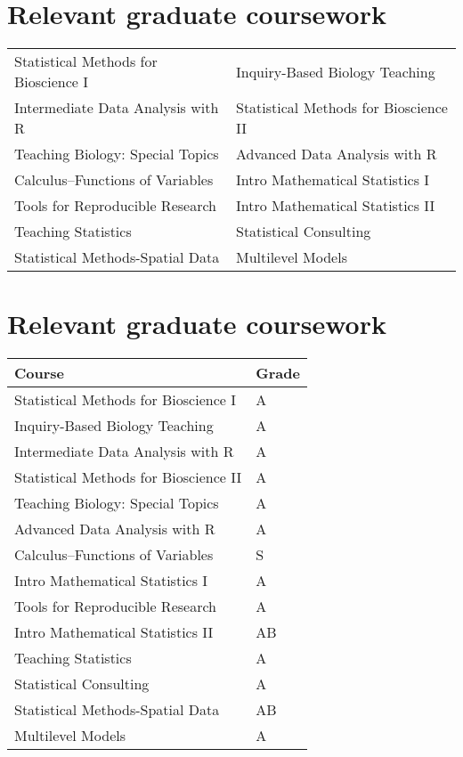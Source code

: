 \documentclass{article}
\begin{document}
\section*{Relevant graduate coursework}
\label{sec:org5770c94}

\begin{center}
\begin{tabular}{ll}
Statistical Methods for Bioscience I & Inquiry-Based Biology Teaching\\
Intermediate Data Analysis with R & Statistical Methods for Bioscience II\\
Teaching Biology: Special Topics & Advanced Data Analysis with R\\
Calculus--Functions of Variables & Intro Mathematical Statistics I\\
Tools for Reproducible Research & Intro Mathematical Statistics II\\
Teaching Statistics & Statistical Consulting\\
Statistical Methods-Spatial Data & Multilevel Models\\
\end{tabular}
\end{center}

\section*{Relevant graduate coursework}
\label{sec:orgb87ab4d}
\begin{center}
\begin{tabular}{ll}
Course & Grade\\
\hline
Statistical Methods for Bioscience I & A\\
Inquiry-Based Biology Teaching & A\\
Intermediate Data Analysis with R & A\\
Statistical Methods for Bioscience II & A\\
Teaching Biology: Special Topics & A\\
Advanced Data Analysis with R & A\\
Calculus--Functions of Variables & S\\
Intro Mathematical Statistics I & A\\
Tools for Reproducible Research & A\\
Intro Mathematical Statistics II & AB\\
Teaching Statistics & A\\
Statistical Consulting & A\\
Statistical Methods-Spatial Data & AB\\
Multilevel Models & A\\
\end{tabular}
\end{center}
\end{document}
